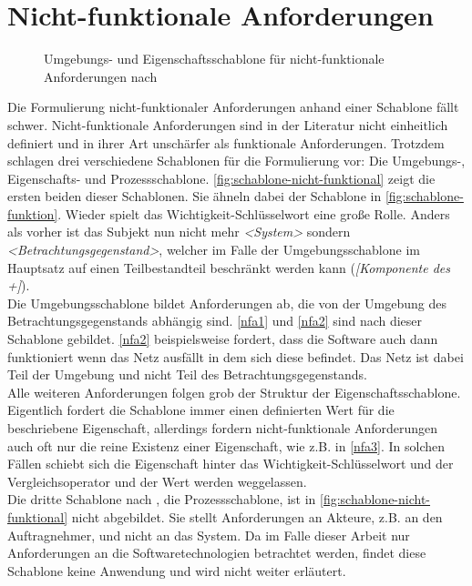 \section{Nicht-funktionale Anforderungen}
\label{sec:nicht-funktionale}

\begin{figure}
    \centering
    
    
    \caption{Umgebungs- und Eigenschaftsschablone für nicht-funktionale Anforderungen nach }
    \label{fig:schablone-nicht-funktional}
\end{figure}

Die Formulierung nicht-funktionaler Anforderungen anhand einer Schablone fällt schwer. Nicht-funktionale
Anforderungen sind in der Literatur nicht einheitlich definiert und in ihrer Art unschärfer als funktionale
Anforderungen. Trotzdem schlagen  drei verschiedene Schablonen für die Formulierung
vor: Die Umgebungs-, Eigenschafts- und Prozessschablone. \autoref{fig:schablone-nicht-funktional} zeigt
die ersten beiden dieser Schablonen. Sie ähneln dabei der Schablone in \autoref{fig:schablone-funktion}.
Wieder spielt das Wichtigkeit-Schlüsselwort eine große Rolle. Anders als vorher ist das Subjekt nun 
nicht mehr \emph{<System>} sondern \emph{<Betrachtungsgegenstand>}, welcher im Falle der Umgebungsschablone
im Hauptsatz auf einen Teilbestandteil beschränkt werden kann (\emph{[Komponente des +]}).\\
Die Umgebungsschablone bildet Anforderungen ab, die von der Umgebung 
des Betrachtungsgegenstands abhängig sind. \ref{nfa1} und \ref{nfa2} sind nach dieser Schablone gebildet.
\ref{nfa2} beispielsweise fordert, dass die Software auch dann funktioniert wenn das Netz ausfällt in dem 
sich diese befindet. Das Netz ist dabei Teil der Umgebung und nicht Teil des Betrachtungsgegenstands.\\
Alle weiteren Anforderungen folgen grob der Struktur der Eigenschaftsschablone. Eigentlich fordert die 
Schablone immer einen definierten Wert für die beschriebene Eigenschaft, allerdings fordern nicht-funktionale
Anforderungen auch oft nur die reine Existenz einer Eigenschaft, wie z.B. in \ref{nfa3}.
In solchen Fällen schiebt sich die Eigenschaft hinter das 
Wichtigkeit-Schlüsselwort und der Vergleichsoperator und der Wert werden weggelassen.\\
Die dritte Schablone nach , die Prozessschablone, ist in \autoref{fig:schablone-nicht-funktional}
nicht abgebildet. Sie stellt Anforderungen an Akteure, z.B. an den Auftragnehmer, und nicht an das System.
Da im Falle dieser Arbeit nur Anforderungen an die Softwaretechnologien betrachtet werden, findet diese Schablone 
keine Anwendung und wird nicht weiter erläutert.\\

